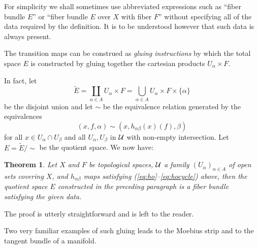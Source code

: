 \documentclass[12pt,titlepage]{article}
\def\cU{{\cal U}}
\newtheorem{theorem}{Theorem}
\begin{document}
For simplicity we shall sometimes use abbreviated expressions such as
``fiber bundle \(E\)'' or ``fiber bundle \(E\) over \(X\) with fiber
\(F\)'' without specifying all of the data required by the definition.
It is to be understood however that such data is always present.





The transition maps can be construed as {\em gluing instructions\/}
%
 by
which the total space \(E\) is constructed by gluing together
the cartesian products
\(U_\alpha  \times F\).

In fact, let  
\[
\tilde E = \coprod_{\alpha \in A }U_\alpha \times
F=\bigcup_{\alpha \in A}U_\alpha \times F\times\{\alpha \}
\]
 be the
disjoint union and let \(\sim\) be the equivalence relation
generated by the equivalences 
\begin{equation}\label{eq:glue}
(x,f,\alpha) \sim (x,
h_{\alpha\beta}(x)(f),\beta)
\end{equation}%
 for all \(x \in
U_\alpha \cap U_\beta \) and all \(U_\alpha ,U_\beta  \) in \(\cU \)
with non-empty intersection.
Let
\(E=\tilde
E / \sim\) be the quotient space.
We now have:
\begin{theorem}\label{th:glue}
Let \(X\) and \(F\) be topological spaces, \(\cU \) a family
\((U_\alpha)_{\alpha \in A}\) of  open sets covering
\(X\), and \(h_{\alpha\beta}\) maps satisfying
(\ref{eq:ho}--\ref{eq:hocycle})
above, then the quotient space \(E\) constructed in the preceding paragraph
is a
fiber bundle satisfying the given data.
\end{theorem}%
The proof is utterly straightforward and is left to the reader.

Two very familiar examples of such gluing leads to the Moebius strip 
and to the tangent bundle of a manifold. 
\end{document}
